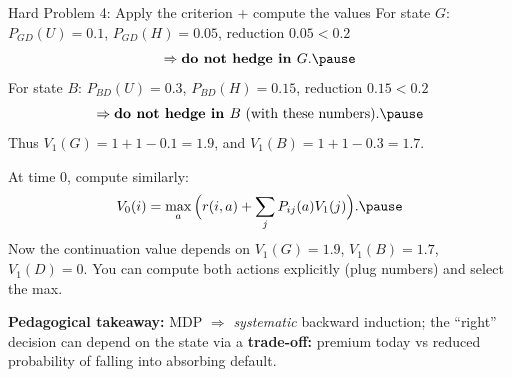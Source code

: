 \documentclass[aspectratio=169]{beamer}
\begin{document}
\begin{frame}{Hard Problem 4: Apply the criterion + compute the values}
For state $G$: $P_{GD}(U)=0.1$, $P_{GD}(H)=0.05$, reduction $0.05<0.2$
\[
\Rightarrow \textbf{do not hedge in } G.\pause
\vspace{-3mm}
\]
For state $B$: $P_{BD}(U)=0.3$, $P_{BD}(H)=0.15$, reduction $0.15<0.2$
\[
\Rightarrow \textbf{do not hedge in } B \text{ (with these numbers)}.
\vspace{-2mm}\pause
\]
Thus $V_1(G)=1+1-0.1=1.9$, and $V_1(B)=1+1-0.3=1.7$.

At time $0$, compute similarly:
\[
V_0(i)=\max_a\Big(r(i,a)+\sum_j P_{ij}(a)V_1(j)\Big).
\vspace{-2mm}\pause
\]
Now the continuation value depends on $V_1(G)=1.9$, $V_1(B)=1.7$, $V_1(D)=0$.
You can compute both actions explicitly (plug numbers) and select the max.

\medskip
\textbf{Pedagogical takeaway:}
MDP $\Rightarrow$ \emph{systematic} backward induction; the “right” decision can depend on the state via
a \textbf{trade-off:} premium today vs reduced probability of falling into absorbing default.
\end{frame}
\end{document}

